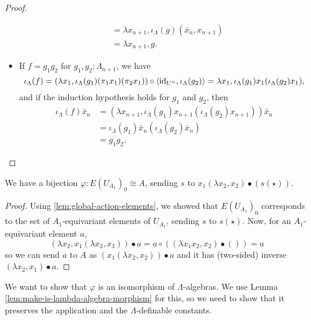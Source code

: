\begin{proof}
\begin{itemize}
\begin{align*}
        &= \lambda x_{n + 1}, \iota_\Lambda(g) (\bar x_n, x_{n + 1})\\
        &= \lambda x_{n + 1}, g.
      \end{align*}
    \item If $ f = g_1 g_2 $ for $ g_1, g_2 : \Lambda_{n + 1} $, we have
      \[
        \iota_\Lambda(f)
        = (\lambda x_1, \iota_\Lambda(g_1) (\pi_1 x_1) (\pi_2 x_1)) \circ \langle \text{id}_{U^n}, \iota_\Lambda(g_2) \rangle
        = \lambda x_1, \iota_\Lambda(g_1) x_1 (\iota_\Lambda(g_2) x_1),
      \]
      and if the induction hypothesis holds for $ g_1 $ and $ g_2 $, then
      \begin{align*}
        \iota_\Lambda(f) \bar x_n
        &= (\lambda x_{n + 1}, \iota_\Lambda(g_1) x_{n + 1} (\iota_\Lambda(g_2) x_{n + 1})) \bar x_n\\
        &= \iota_\Lambda(g_1) \bar x_n (\iota_\Lambda(g_2) \bar x_n)\\
        &= g_1 g_2.
      \end{align*}
  \end{itemize}
\end{proof}

\begin{lemma}
  We have a bijection $ \varphi: E(U_{A_1})_0 \cong A $, sending $ s $ to $ x_1 (\lambda x_2, x_2) \bullet (s(\star)) $.
\end{lemma}
\begin{proof}
  Using \ref{lem:global-action-elements}, we showed that $ E(U_{A_1})_0 $ corresponds to the set of $ A_1 $-equivariant elements of $ U_{A_1} $, sending $ s $ to $ s(\star) $. Now, for an $ A_1 $-equivariant element $ a $,
  \[ (\lambda x_2, x_1 (\lambda x_3, x_3)) \bullet a = a \circ ((\lambda x_1 x_2, x_2) \bullet ()) = a \]
  so we can send $ a $ to $ A $ as $ (x_1 (\lambda x_2, x_2)) \bullet a $ and it has (two-sided) inverse $ (\lambda x_2, x_1) \bullet a $.
\end{proof}

We want to show that $ \varphi $ is an isomorphism of $ \Lambda $-algebras. We use Lemma \ref{lem:make-is-lambda-algebra-morphism} for this, so we need to show that it preserves the application and the $ \Lambda $-definable constants.

